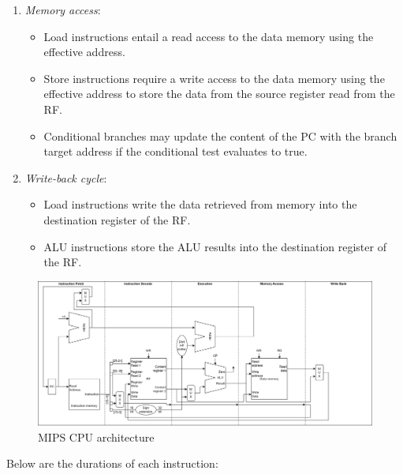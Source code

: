\begin{enumerate}
\begin{itemize}
        \end{itemize}
    \item \textit{Memory access}:
        \begin{itemize}
            \item Load instructions entail a read access to the data memory using the effective address.
            \item Store instructions require a write access to the data memory using the effective address to store the data from the source register read from the RF.
            \item Conditional branches may update the content of the PC with the branch target address if the conditional test evaluates to true.
        \end{itemize}
    \item \textit{Write-back cycle}: 
        \begin{itemize}
            \item Load instructions write the data retrieved from memory into the destination register of the RF.
            \item ALU instructions store the ALU results into the destination register of the RF.
        \end{itemize}
\end{enumerate}
\begin{figure}[H]
    \centering
    \includegraphics[width=1\linewidth]{images/mips.png}
    \caption{MIPS CPU architecture}
\end{figure}
Below are the durations of each instruction:
